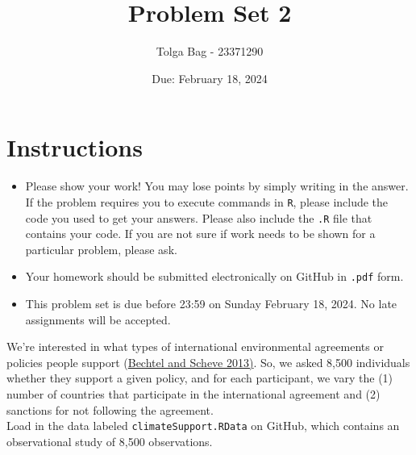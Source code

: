 \documentclass[12pt,letterpaper]{article}
\title{Problem Set 2}
\date{Due: February 18, 2024}
\author{Tolga Bag - 23371290}
\begin{document}
	\maketitle
	\section*{Instructions}
	\begin{itemize}
		\item Please show your work! You may lose points by simply writing in the answer. If the problem requires you to execute commands in \texttt{R}, please include the code you used to get your answers. Please also include the \texttt{.R} file that contains your code. If you are not sure if work needs to be shown for a particular problem, please ask.
		\item Your homework should be submitted electronically on GitHub in \texttt{.pdf} form.
		\item This problem set is due before 23:59 on Sunday February 18, 2024. No late assignments will be accepted.
	\end{itemize}

	
	

	\vspace{.25cm}
\noindent We're interested in what types of international environmental agreements or policies people support (\href{https://www.pnas.org/content/110/34/13763}{Bechtel and Scheve 2013)}. So, we asked 8,500 individuals whether they support a given policy, and for each participant, we vary the (1) number of countries that participate in the international agreement and (2) sanctions for not following the agreement. \\

\noindent Load in the data labeled \texttt{climateSupport.RData} on GitHub, which contains an observational study of 8,500 observations.
\end{document}
